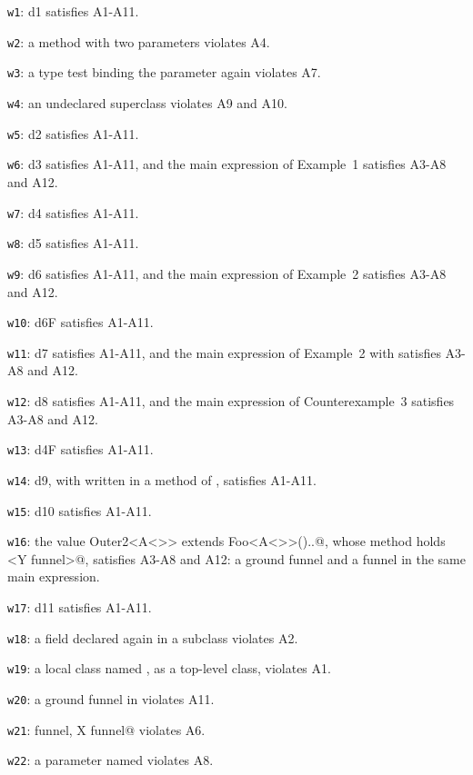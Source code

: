 \begin{description}\sloppy
\item[W1] \texttt{w1}: d1 satisfies A1-A11.
\item[W2] \texttt{w2}: a method with two parameters \Q@x@ violates A4.
\item[W3] \texttt{w3}: a type test binding the parameter \Q@x@ again violates A7.
\item[W4] \texttt{w4}: an undeclared superclass violates A9 and A10.
\item[W5] \texttt{w5}: d2 satisfies A1-A11.
\item[W6] \texttt{w6}: d3 satisfies A1-A11, and the main expression of Example~1 satisfies A3-A8 and A12.
\item[W7] \texttt{w7}: d4 satisfies A1-A11.
\item[W8] \texttt{w8}: d5 satisfies A1-A11.
\item[W9] \texttt{w9}: d6 satisfies A1-A11, and the main expression of Example~2 satisfies A3-A8 and A12.
\item[W10] \texttt{w10}: d6F satisfies A1-A11.
\item[W11] \texttt{w11}: d7 satisfies A1-A11, and the main expression of Example~2 with \Q@show@ satisfies A3-A8 and A12.
\item[W12] \texttt{w12}: d8 satisfies A1-A11, and the main expression of Counterexample~3 satisfies A3-A8 and A12.
\item[W13] \texttt{w13}: d4F satisfies A1-A11.
\item[W14] \texttt{w14}: d9, with \Q@Inner@ written in a method of \Q@Outer@, satisfies A1-A11.
\item[W15] \texttt{w15}: d10 satisfies A1-A11.
\item[W16] \texttt{w16}: the value \Q@new Outer2<A<>> extends Foo<A<>>(){..}@, whose method \Q@g@ holds <Y funnel>@, satisfies A3-A8 and A12: a ground funnel and a funnel in the same main expression.
\item[W17] \texttt{w17}: d11 satisfies A1-A11.
\item[W18] \texttt{w18}: a field \Q@f@ declared again in a subclass violates A2.
\item[W19] \texttt{w19}: a local class named \Q@A@, as a top-level class, violates A1.
\item[W20] \texttt{w20}: a ground funnel in \decls violates A11.
\item[W21] \texttt{w21}: \Q@X funnel, X funnel@ violates A6.
\item[W22] \texttt{w22}: a parameter named \Q@this@ violates A8.

\end{description}
